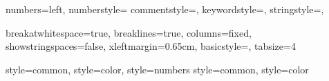 \usepackage{listings}
\usepackage{multicol}


 {numbers=left, numberstyle=\ttfamily}
{
    commentstyle=\color{dkgreen},
    keywordstyle=\color{blue},
    stringstyle=\color{mauve},
}

{
    breakatwhitespace=true,
    breaklines=true,
    columns=fixed,
    showstringspaces=false,
    xleftmargin=0.65cm,
    basicstyle=\small\ttfamily,
    tabsize=4
}

 {style=common, style=color, style=numbers}
 {style=common, style=color}
